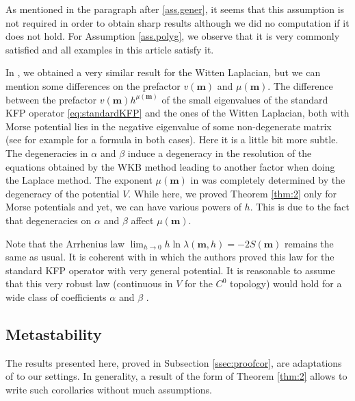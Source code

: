 \documentclass[12pt]{amsart}
\numberwithin{equation}{section}
\numberwithin{figure}{section}
\def\m{\mathbf{m}}
\begin{document}
As mentioned in the paragraph after \eqref{ass.gener}, it seems that this assumption is not required in order to obtain sharp results although we did no computation if it does not hold. For Assumption \ref{ass.polyg}, we observe that it is very commonly satisfied and all examples in this article satisfy it.

In \cite{De25_1}, we obtained a very similar result for the Witten Laplacian, but we can mention some differences on the prefactor $v(\m)$ and $\mu(\m)$. The difference between the prefactor $v(\m)h^{\mu(\m)}$ of the small eigenvalues of the standard KFP operator \eqref{eq:standardKFP} and the ones of the Witten Laplacian, both with Morse potential lies in the negative eigenvalue of some non-degenerate matrix (see for example \cite{BoLePMi22} for a formula in both cases). Here it is a little bit more subtle. The degeneracies in $\alpha$ and $\beta$ induce a degeneracy in the resolution of the equations obtained by the WKB method leading to another factor when doing the Laplace method. The exponent $\mu(\m)$ in \cite{De25_1} was completely determined by the degeneracy of the potential $V$. While here, we proved Theorem \ref{thm:2} only for Morse potentials and yet, we can have various powers of $h$. This is due to the fact that degeneracies on $\alpha$ and $\beta$ affect $\mu(\m)$.

Note that the Arrhenius law $\lim_{h\to0}h\ln\lambda(\m,h) = -2S(\m)$ remains the same as usual. It is coherent with \cite[Corollary 1.2.4]{NiSaWh24} in which the authors proved this law for the standard KFP operator with very general potential. It is reasonable to assume that this very robust law (continuous in $V$ for the $C^0$ topology) would hold for a wide class of coefficients $\alpha$ and $\beta$%
.






\subsection{Metastability}
The results presented here, proved in Subsection \ref{ssec:proofcor}, are adaptations of \cite[Corollary 1.5, 1.6]{BoLePMi22} to our settings. In generality, a %
result of the form of Theorem \ref{thm:2} allows to write such corollaries without much assumptions.
\end{document}
